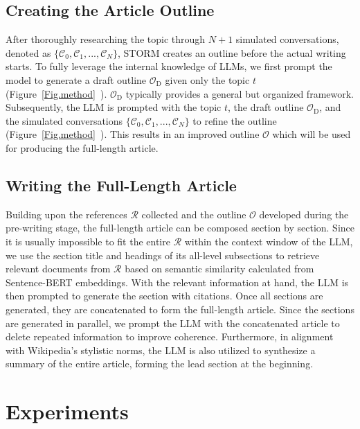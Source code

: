 \documentclass[11pt]{article}
\newcommand{\system}[0]{STORM\xspace}
\newcommand{\reffig}[1]{Figure~\ref{#1}}
\begin{document}
\subsection{Creating the Article Outline}
\label{sec:method_outline}
After thoroughly researching the topic through $N+1$ simulated conversations, denoted as $\{\mathcal{C}_0, \mathcal{C}_1,..., \mathcal{C}_N\}$, \system creates an outline before the actual writing starts. To fully leverage the internal knowledge of LLMs, we first prompt the model to generate a draft outline $\mathcal{O}_\text{D}$ given only the topic $t$ (\reffig{Fig.method}~). $\mathcal{O}_\text{D}$ typically provides a general but organized framework. Subsequently, the LLM is prompted with the topic $t$,  the draft outline $\mathcal{O}_\text{D}$, and the simulated conversations $\{\mathcal{C}_0, \mathcal{C}_1,..., \mathcal{C}_N\}$ to refine the outline (\reffig{Fig.method}~). This results in an improved outline $\mathcal{O}$ which will be used for producing the full-length article.

\subsection{Writing the Full-Length Article}
\label{sec:method_article}

Building upon the references $\mathcal{R}$ collected and the outline $\mathcal{O}$ developed during the pre-writing stage, the full-length article can be composed section by section. Since it is usually impossible to fit the entire $\mathcal{R}$ within the context window of the LLM, we use the section title and headings of its all-level subsections to retrieve relevant documents from $\mathcal{R}$ based on semantic similarity calculated from Sentence-BERT embeddings. With the relevant information at hand, the LLM is then prompted to generate the section with citations. Once all sections are generated, %
they are concatenated to form the full-length article. %
Since the sections are generated in parallel, we prompt the LLM with the concatenated article to delete repeated information to improve coherence. Furthermore, in alignment with Wikipedia's stylistic norms, the LLM is also utilized to synthesize a summary of the entire article, forming the lead section at the beginning.




\section{Experiments}
\end{document}
